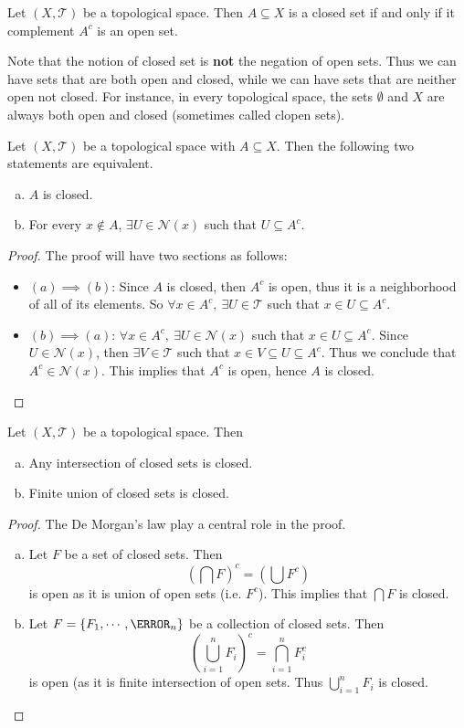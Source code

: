 \begin{definition}
	Let $(X,\mathcal{T})$ be a topological space. Then $A \subseteq X$ is a closed set if and only if it complement $A^c$ is an open set. 
\end{definition}

Note that the notion of closed set is \textbf{not} the negation of open sets. Thus we can have sets that are both open and closed, while we can have sets that are neither open not closed. For instance, in every topological space, the sets $\emptyset$ and $X$ are always both open and closed (sometimes called clopen sets).

\begin{lemma}{}
	Let $(X,\mathcal{T})$ be a topological space with $A \subseteq X$. Then the following two statements are equivalent.
	\begin{enumerate}[(a)]
		\item $A$ is closed.
		\item For every $x \notin A$, $\exists U \in \mathcal{N}(x)$ such that $U \subseteq A^c$.
	\end{enumerate}
\end{lemma}
\begin{proof}
	The proof will have two sections as follows:
	\begin{itemize}
		\item $(a) \implies (b)$: Since $A$ is closed, then $A^c$ is open, thus it is a neighborhood of all of its elements. So $\forall x\in A^c,\ \exists U \in \mathcal{T}$ such that $x \in U \subseteq A^c$.
		\item $(b) \implies (a)$: $\forall x \in A^c,\ \exists U \in \mathcal{N}(x)$ such that $x\in U \subseteq A^c$. Since $U \in \mathcal{N}(x)$, then $\exists V \in \mathcal{T}$ such that $x\in V \subseteq U \subseteq A^c$. Thus we conclude that $A^c \in \mathcal{N}(x)$. This implies that $A^c$ is open, hence $A$ is closed. 
	\end{itemize}
\end{proof}

\begin{proposition}
	Let $(X,\mathcal{T})$ be a topological space. Then 
	\begin{enumerate}[(a)]
		\item Any intersection of closed sets is closed.
		\item Finite union of closed sets is closed.
	\end{enumerate}
\end{proposition}
\begin{proof}
	The De Morgan's law play a central role in the proof.
	\begin{enumerate}[(a)]
		\item Let $F$ be a set of closed sets. Then 
		\[ (\bigcap F)^c = (\bigcup F^c) \]
		is open as it is union of open sets (i.e. $F^c$). This implies that $\bigcap F$ is closed. 
		\item Let $F = \{F_1, \cdots, \F_n\}$ be a collection of closed sets. Then 
		\[ (\bigcup_{i=1}^{n} F_i)^c = \bigcap_{i=1}^n F_i^c \]
		is open (as it is finite intersection of open sets. Thus $\bigcup_{i=1}^{n} F_i$ is closed.
	\end{enumerate}
\end{proof}

